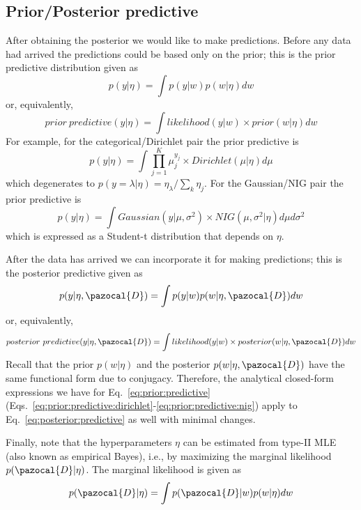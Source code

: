 \subsection{Prior/Posterior predictive}
After obtaining the posterior we would like to make predictions. 
Before any data had arrived the predictions could be based only on the prior; this is the prior predictive distribution given as
\begin{equation}\label{eq:prior:predictive}
	p(y|\eta) = \int p(y|w)p(w|\eta) dw
\end{equation}
or, equivalently, 
\begin{equation}\label{eq:prior:predictive:2}
	prior \ predictive (y|\eta) = \int likelihood(y|w) \times prior(w|\eta) dw
\end{equation}
For example, for the categorical/Dirichlet pair the prior predictive is 
\begin{equation}\label{eq:prior:predictive:dirichlet}
	p(y|\eta) = \int \prod_{j=1}^{K}\mu_j^{y_j} \times Dirichlet(\mu|\eta)d\mu
\end{equation}
which degenerates to $p(y = \lambda|\eta) = \eta_{\lambda} / \sum_k\eta_j$.
For the Gaussian/NIG pair the prior predictive is
\begin{equation}\label{eq:prior:predictive:nig}
	p(y|\eta) = \int Gaussian(y|\mu, \sigma^2)\times NIG(\mu, \sigma^2|\eta)d\mu d\sigma^2
\end{equation}
which is expressed as a Student-t distribution that depends on $\eta$.

After the data has arrived we can incorporate it for making predictions; this is the posterior predictive given as
\begin{equation}\label{eq:posterior:predictive}
	p(y|\eta, \pazocal{D}) = \int p(y|w)p(w|\eta, \pazocal{D}) dw
\end{equation}
or, equivalently, 
\begin{equation}\label{eq:posterior:predictive:2}
	posterior \ predictive (y|\eta, \pazocal{D}) = \int likelihood(y|w) \times posterior(w|\eta, \pazocal{D}) dw
\end{equation}
Recall that the prior $p(w|\eta)$ and the posterior $p(w|\eta, \pazocal{D})$ have the same functional form due to conjugacy. 
Therefore, the analytical closed-form expressions we have for Eq.~\eqref{eq:prior:predictive} (Eqs.~\eqref{eq:prior:predictive:dirichlet}-\eqref{eq:prior:predictive:nig}) apply to Eq.~\eqref{eq:posterior:predictive} as well with minimal changes. 

Finally, note that the hyperparameters $\eta$ can be estimated from type-II MLE (also known as empirical Bayes), i.e., by maximizing the marginal likelihood $p(\pazocal{D}|\eta)$. 
The marginal likelihood is given as
\begin{equation}\label{eq:marginal:likelihood}
	p(\pazocal{D}|\eta) = \int p(\pazocal{D}|w)p(w|\eta) dw
\end{equation}

